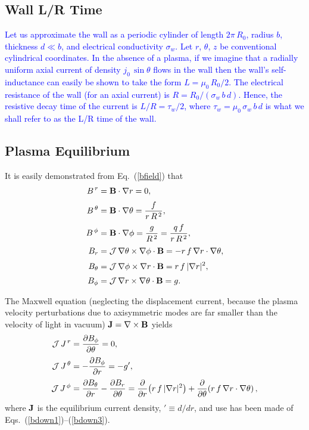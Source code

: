 \documentclass[12pt,prb,aps]{revtex4-1}
\begin{document}
\subsection{Wall L/R Time}\label{loverr}
\textcolor{blue}{Let us approximate the wall as a periodic cylinder of length $2\pi\,R_0$, radius $b$, thickness $d\ll b$, and electrical conductivity $\sigma_w$. 
Let $r$, $\theta$, $z$ be conventional cylindrical coordinates. 
In the absence of a plasma, if we imagine that a radially uniform axial current of density $j_0\,\sin\theta$ flows in the wall then the wall's self-inductance 
can easily be shown to take the form $L=\mu_0\,R_0/2$. The electrical resistance of the wall (for an axial current) is $R=R_0/(\sigma_w\,b\,d)$. 
Hence, the resistive decay time of the current is $L/R= \tau_w/2$, where $\tau_w=\mu_0\,\sigma_w\,b\,d$ is what we shall refer to as the
L/R time of the wall. }

\subsection{Plasma Equilibrium}\label{aequilibrium}
It is easily demonstrated from Eq.~(\ref{bfield}) that\,\cite{tj}
\begin{align}
B^{\,r}&={\bf B}\cdot\nabla r= 0,\label{bup1}\\[0.5ex]
B^{\,\theta} &={\bf B}\cdot\nabla \theta= \frac{f}{r\,R^{\,2}},\label{bup2}\\[0.5ex]
B^{\,\phi} &={\bf B}\cdot\nabla \phi= \frac{g}{R^{\,2}}= \frac{q\,f}{r\,R^{\,2}},\label{bup3}\\[0.5ex]
B_r &={\cal J}\,\nabla\theta\times\nabla\phi\cdot{\bf B}= -r\,f\,\nabla r\cdot\nabla\theta,\label{bdown1}\\[0.5ex]
B_\theta &={\cal J}\,\nabla\phi\times\nabla r\cdot{\bf B}= r\,f\,|\nabla r|^2,\\[0.5ex]
B_\phi &={\cal J}\,\nabla r\times\nabla \theta \cdot{\bf B}= g.\label{bdown3}
\end{align}

The Maxwell equation (neglecting the displacement current, because the plasma velocity perturbations due to axisymmetric modes are far smaller than the velocity of light in vacuum)
${\bf J}= \nabla\times{\bf B}$
yields
\begin{align}
{\cal J}\,J^{\,r} &= \frac{\partial B_\phi}{\partial \theta} =0,\label{jup1}\\[0.5ex]
{\cal J}\,J^{\,\theta} &= -\frac{\partial B_\phi}{\partial r} = - g',\label{jup2}\\[0.5ex]
{\cal J}\,J^{\,\phi}&= \frac{\partial B_\theta}{\partial r} -\frac{\partial B_r}{\partial\theta}=\frac{\partial}{\partial r}\!\left(r\,f\,|\nabla r|^2\right)+ \frac{\partial}{\partial\theta}\!\left(r\,f\,\nabla r\cdot\nabla\theta\right),\label{jup3}
\end{align}
where ${\bf J}$ is the equilibrium current density, $'\equiv d/dr$, and use has been made of  Eqs.~(\ref{bdown1})--(\ref{bdown3}).
\end{document}

